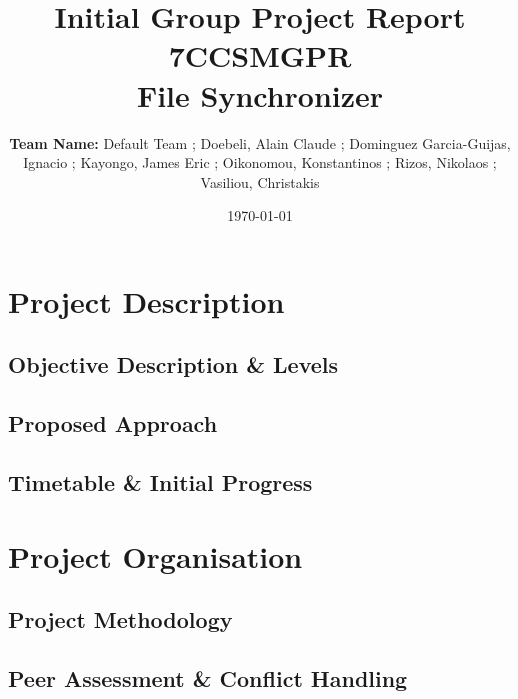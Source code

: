 \documentclass[11pt]{article}
\title{ Initial Group Project Report\\
7CCSMGPR\\[2\baselineskip]
File Synchronizer}
\author{\textbf{Team Name:} Default Team ; Doebeli, Alain Claude ; Dominguez Garcia-Guijas, Ignacio ; Kayongo, James Eric ; 
Oikonomou, Konstantinos ; Rizos, Nikolaos ; Vasiliou, Christakis}
\date{\today}
\begin{document}
\null  %
\nointerlineskip  %
\vfill
\let\snewpage \newpage
\let\newpage \relax
\maketitle
\let \newpage \snewpage
\vfill 
\break %

\section{Project Description}
	\subsection{Objective Description \& Levels}
	\subsection{Proposed Approach}
	\subsection{Timetable \& Initial Progress}
\section{Project Organisation}
	\subsection{Project Methodology}
	\subsection{Peer Assessment \& Conflict Handling}
\end{document}
